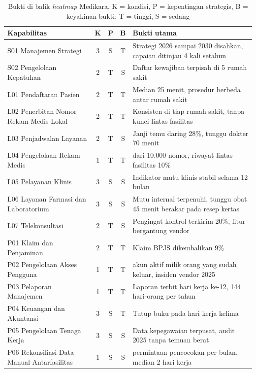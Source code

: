\begin{table}[!htb]
  \centering
  \caption{Bukti di balik \textit{heatmap} Medikara. K = kondisi, P = kepentingan strategis, B = keyakinan
           bukti; T = tinggi, S = sedang}
  \label{tab:ch05-bukti-heatmap}
  \footnotesize
  \begin{tabularx}{\textwidth}{>{\raggedright\arraybackslash}p{4.0cm}ccc>{\raggedright\arraybackslash}X}
    \hline
    \textbf{Kapabilitas} & \textbf{K} & \textbf{P} & \textbf{B} & \textbf{Bukti utama} \\
    \hline
    S01 Manajemen Strategi & 3 & S & T & Strategi 2026 sampai 2030 disahkan, capaian ditinjau 4 kali setahun \\
    \hline
    S02 Pengelolaan Kepatuhan & 2 & T & S & Daftar kewajiban terpisah di 5 rumah sakit \\
    \hline
    L01 Pendaftaran Pasien & 2 & T & T & Median 25 menit, prosedur berbeda antar rumah sakit \\
    \hline
    L02 Penerbitan Nomor Rekam Medis Lokal & 2 & T & T & Konsisten di tiap rumah sakit, tanpa kunci lintas fasilitas \\
    \hline
    L03 Penjadwalan Layanan & 2 & T & S & Janji temu daring 28\%, tunggu dokter 70 menit \\
    \hline
    L04 Pengelolaan Rekam Medis & 1 & T & T & 1.140 dari 10.000 nomor, riwayat lintas fasilitas 10\% \\
    \hline
    L05 Pelayanan Klinis & 3 & S & S & Indikator mutu klinis stabil selama 12 bulan \\
    \hline
    L06 Layanan Farmasi dan Laboratorium & 3 & S & S & Mutu internal terpenuhi, tunggu obat 45 menit berakar pada resep kertas \\
    \hline
    L07 Telekonsultasi & 2 & T & S & Pengingat kontrol terkirim 20\%, fitur bergantung vendor \\
    \hline
    P01 Klaim dan Penjaminan & 2 & T & T & Klaim BPJS dikembalikan 9\% \\
    \hline
    P02 Pengelolaan Akses Pengguna & 1 & T & T & 212 akun aktif milik orang yang sudah keluar, insiden vendor 2025 \\
    \hline
    P03 Pelaporan Manajemen & 1 & T & T & Laporan terbit hari kerja ke-12, 144 hari-orang per tahun \\
    \hline
    P04 Keuangan dan Akuntansi & 3 & S & T & Tutup buku pada hari kerja kelima \\
    \hline
    P05 Pengelolaan Tenaga Kerja & 3 & S & S & Data kepegawaian terpusat, audit 2025 tanpa temuan berat \\
    \hline
    P06 Rekonsiliasi Data Manual Antarfasilitas & 1 & S & S & 640 permintaan pencocokan per bulan, median 2 hari kerja \\
    \hline
  \end{tabularx}
\end{table}

